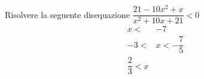 	Risolvere la seguente disequazione $\dfrac{21-10x^2+x}{x^2+10x+21}< 0$
	\begin{align*}
	x<&-7\\ -3<&x<-\dfrac{7}{5}\\ \dfrac{2}{3}< x\\
	\end{align*}
